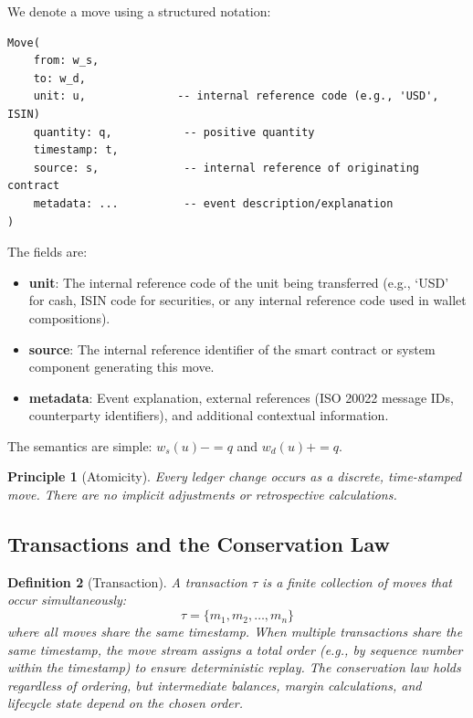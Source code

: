 \documentclass[11pt,a4paper]{article}
\newtheorem{definition}{Definition}[section]
\newtheorem{principle}[definition]{Principle}
\begin{document}
We denote a move using a structured notation:

\begin{lstlisting}
Move(
    from: w_s,
    to: w_d,
    unit: u,              -- internal reference code (e.g., 'USD', ISIN)
    quantity: q,           -- positive quantity
    timestamp: t,
    source: s,             -- internal reference of originating contract
    metadata: ...          -- event description/explanation
)
\end{lstlisting}

The fields are:
\begin{itemize}[nosep]
\item \textbf{unit}: The internal reference code of the unit being transferred (e.g., `USD' for cash, ISIN code for securities, or any internal reference code used in wallet compositions).
\item \textbf{source}: The internal reference identifier of the smart contract or system component generating this move.
\item \textbf{metadata}: Event explanation, external references (ISO 20022 message IDs, counterparty identifiers), and additional contextual information.
\end{itemize}

The semantics are simple: $w_s(u) \mathbin{{-}{=}} q$ and $w_d(u) \mathbin{{+}{=}} q$.

\begin{principle}[Atomicity]
Every ledger change occurs as a discrete, time-stamped move. There are no implicit adjustments or retrospective calculations.
\end{principle}

\subsection{Transactions and the Conservation Law}

\begin{definition}[Transaction]
A transaction $\tau$ is a finite collection of moves that occur simultaneously:
\[
\tau = \{m_1, m_2, \ldots, m_n\}
\]
where all moves share the same timestamp. When multiple transactions share the same timestamp, the move stream assigns a total order (e.g., by sequence number within the timestamp) to ensure deterministic replay. The conservation law holds regardless of ordering, but intermediate balances, margin calculations, and lifecycle state depend on the chosen order.
\end{definition}
\end{document}
